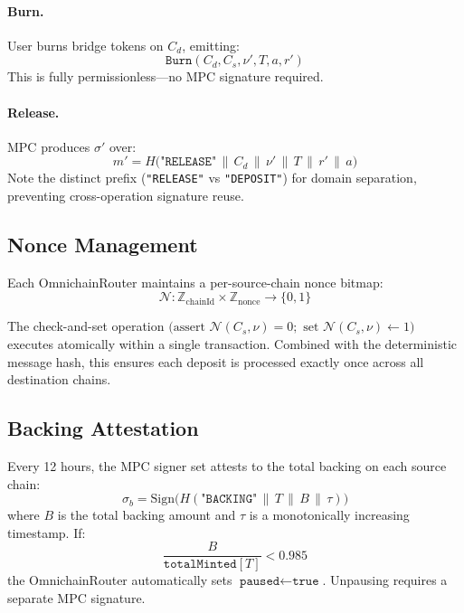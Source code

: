 \paragraph{Burn.} User burns bridge tokens on $C_d$, emitting:
\[
  \texttt{Burn}(C_d, C_s, \nu', T, a, r')
\]
This is fully permissionless---no MPC signature required.

\paragraph{Release.} MPC produces $\sigma'$ over:
\begin{equation}
  m' = H\bigl(\texttt{"RELEASE"} \,\|\, C_d \,\|\, \nu' \,\|\, T \,\|\, r' \,\|\, a\bigr)
\end{equation}
Note the distinct prefix (\texttt{"RELEASE"} vs \texttt{"DEPOSIT"}) for domain separation, preventing cross-operation signature reuse.

\subsection{Nonce Management}

Each OmnichainRouter maintains a per-source-chain nonce bitmap:
\begin{equation}
  \mathcal{N}: \mathbb{Z}_{\text{chainId}} \times \mathbb{Z}_{\text{nonce}} \rightarrow \{0, 1\}
\end{equation}

The check-and-set operation $\bigl(\text{assert } \mathcal{N}(C_s, \nu) = 0; \text{ set } \mathcal{N}(C_s, \nu) \leftarrow 1\bigr)$ executes atomically within a single transaction. Combined with the deterministic message hash, this ensures each deposit is processed exactly once across all destination chains.

\subsection{Backing Attestation}

Every 12 hours, the MPC signer set attests to the total backing on each source chain:
\begin{equation}
  \sigma_b = \text{Sign}\bigl(H(\texttt{"BACKING"} \,\|\, T \,\|\, B \,\|\, \tau)\bigr)
\end{equation}
where $B$ is the total backing amount and $\tau$ is a monotonically increasing timestamp. If:
\begin{equation}
  \frac{B}{\texttt{totalMinted}[T]} < 0.985
\end{equation}
the OmnichainRouter automatically sets $\texttt{paused} \leftarrow \texttt{true}$. Unpausing requires a separate MPC signature.

